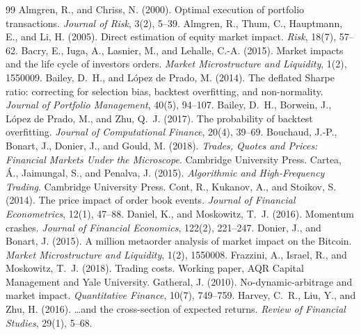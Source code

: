 \documentclass[11pt,a4paper]{article}
\begin{document}
\renewcommand{\refname}{References}
\begin{thebibliography}{99}\small\setlength{\itemsep}{1pt}
 Almgren, R., and Chriss, N. (2000). Optimal execution of portfolio transactions. \emph{Journal of Risk}, 3(2), 5--39.
 Almgren, R., Thum, C., Hauptmann, E., and Li, H. (2005). Direct estimation of equity market impact. \emph{Risk}, 18(7), 57--62.
 Bacry, E., Iuga, A., Lasnier, M., and Lehalle, C.-A. (2015). Market impacts and the life cycle of investors orders. \emph{Market Microstructure and Liquidity}, 1(2), 1550009.
 Bailey, D.~H., and L\'opez de Prado, M. (2014). The deflated Sharpe ratio: correcting for selection bias, backtest overfitting, and non-normality. \emph{Journal of Portfolio Management}, 40(5), 94--107.
 Bailey, D.~H., Borwein, J., L\'opez de Prado, M., and Zhu, Q.~J. (2017). The probability of backtest overfitting. \emph{Journal of Computational Finance}, 20(4), 39--69.
 Bouchaud, J.-P., Bonart, J., Donier, J., and Gould, M. (2018). \emph{Trades, Quotes and Prices: Financial Markets Under the Microscope}. Cambridge University Press.
 Cartea, \'A., Jaimungal, S., and Penalva, J. (2015). \emph{Algorithmic and High-Frequency Trading}. Cambridge University Press.
 Cont, R., Kukanov, A., and Stoikov, S. (2014). The price impact of order book events. \emph{Journal of Financial Econometrics}, 12(1), 47--88.
 Daniel, K., and Moskowitz, T.~J. (2016). Momentum crashes. \emph{Journal of Financial Economics}, 122(2), 221--247.
 Donier, J., and Bonart, J. (2015). A million metaorder analysis of market impact on the Bitcoin. \emph{Market Microstructure and Liquidity}, 1(2), 1550008.
 Frazzini, A., Israel, R., and Moskowitz, T.~J. (2018). Trading costs. Working paper, AQR Capital Management and Yale University.
 Gatheral, J. (2010). No-dynamic-arbitrage and market impact. \emph{Quantitative Finance}, 10(7), 749--759.
 Harvey, C.~R., Liu, Y., and Zhu, H. (2016). \ldots and the cross-section of expected returns. \emph{Review of Financial Studies}, 29(1), 5--68.

\end{thebibliography}
\end{document}

